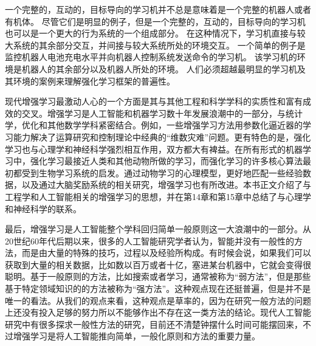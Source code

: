 \documentclass{ctexart}
\begin{document}
            一个完整的，互动的，目标导向的学习机并不总是意味着是一个完整的机器人或者有机体。 尽管它们是明显的例子，但是一个完整的，互动的，目标导向的学习机也可以是一个更大的行为系统的一个组成部分。 在这种情况下，学习机直接与较大系统的其余部分交互，并间接与较大系统所处的环境交互。 一个简单的例子是监控机器人电池充电水平并向机器人控制系统发送命令的学习机。 该学习机的环境是机器人的其余部分以及机器人所处的环境。 人们必须超越最明显的学习机及其环境的案例来理解强化学习框架的普遍性。

            现代增强学习最激动人心的一个方面是其与其他工程和科学学科的实质性和富有成效的交叉。增强学习是人工智能和机器学习数十年发展浪潮中的一部分，与统计学，优化和其他数学学科紧密结合。例如，一些增强学习方法用参数化逼近器的学习能力解决了运算研究和控制理论中经典的“维数灾难”问题。更有特色的是，强化学习也与心理学和神经科学强烈相互作用，双方都大有裨益。在所有形式的机器学习中，强化学习最接近人类和其他动物所做的学习，而强化学习的许多核心算法最初都受到生物学习系统的启发。通过动物学习的心理模型，更好地匹配一些经验数据，以及通过大脑奖励系统的相关研究，增强学习也有所改进。本书正文介绍了与工程学和人工智能相关的增强学习的思想，并在第14章和第15章中总结了与心理学和神经科学的联系。

            最后，增强学习是人工智能整个学科回归简单一般原则这一大浪潮中的一部分。从20世纪60年代后期以来，很多的人工智能研究学者认为，智能并没有一般性的方法，而是由大量的特殊的技巧，过程以及经验所构成。有时候会说，如果我们可以获取到大量的相关数据，比如数以百万或者十亿，塞进某台机器中，它就会变得很聪明。基于一般原则的方法，比如搜索或者学习，通常被称为“弱方法”，但是那些基于特定领域知识的的方法被称为“强方法”。这种观点现在还挺普遍，但是并不是唯一的看法。从我们的观点来看，这种观点是草率的，因为在研究一般方法的问题上还没有投入足够的努力所以不能够作出不存在这一类方法的结论。现代人工智能研究中有很多探求一般性方法的研究，目前还不清楚钟摆什么时间可能摆回来，不过增强学习是将人工智能推向简单，一般化原则和方法的重要力量。
\end{document}
